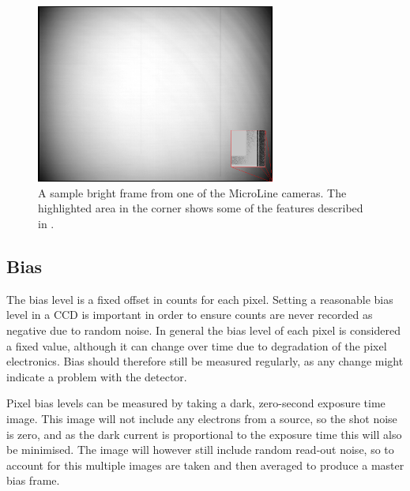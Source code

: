 \begin{colsection}
\begin{colsection}
\begin{figure}[p]
    \begin{center}
        \includegraphics[width=0.7\textwidth]{images/sample.png}
    \end{center}
    \caption[A sample bright frame from one of the MicroLine cameras]{
        A sample bright frame from one of the MicroLine cameras. The highlighted area in the corner shows some of the features described in .
    }\label{fig:frame}
\end{figure}

\clearpage

\end{colsection}

\newpage
\subsection{Bias}
\label{sec:bias}
\begin{colsection}

The bias level is a fixed offset in counts for each pixel. Setting a reasonable bias level in a CCD is important in order to ensure counts are never recorded as negative due to random noise. In general the bias level of each pixel is considered a fixed value, although it can change over time due to degradation of the pixel electronics. Bias should therefore still be measured regularly, as any change might indicate a problem with the detector.

Pixel bias levels can be measured by taking a dark, zero-second exposure time image. This image will not include any electrons from a source, so the shot noise is zero, and as the dark current is proportional to the exposure time this will also be minimised. The image will however still include random read-out noise, so to account for this multiple images are taken and then averaged to produce a master bias frame.


\end{colsection}
\end{colsection}
